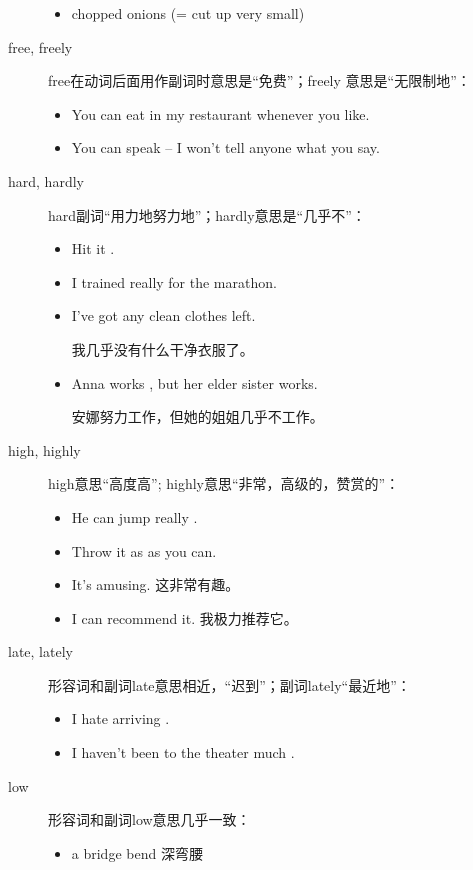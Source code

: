 \begin{description}
\begin{itemize}
  \item {} chopped onions (= cut up very small)
  \end{itemize}

\item[free, freely] free在动词后面用作副词时意思是“免费”；freely 意思是“无限制地”：
  \begin{itemize}
  \item You can eat  in my restaurant whenever you like.

  \item You can speak  – I won't tell anyone what you say.
  \end{itemize}
\item[hard, hardly] hard副词“用力地努力地”；hardly意思是“几乎不”：
  \begin{itemize}
  \item Hit it .
  \item I trained really  for the marathon.
  \item I've  got any clean clothes left.

    我几乎没有什么干净衣服了。
  \item Anna works , but her elder sister  works.

    安娜努力工作，但她的姐姐几乎不工作。
  \end{itemize}
\item[high, highly] high意思“高度高”; highly意思“非常，高级的，赞赏的”：
  \begin{itemize}
  \item He can jump really .
  \item Throw it as  as you can.
  \item It's  amusing. 这非常有趣。
  \item I can  recommend it. 我极力推荐它。
  \end{itemize}
\item[late, lately] 形容词和副词late意思相近，“迟到”；副词lately“最近地”：
  \begin{itemize}
  \item I hate arriving .

  \item I haven't been to the theater much .
  \end{itemize}
\item[low] 形容词和副词low意思几乎一致：
  \begin{itemize}
  \item a  bridge \qquad bend  深弯腰
  \end{itemize}


\end{description}
